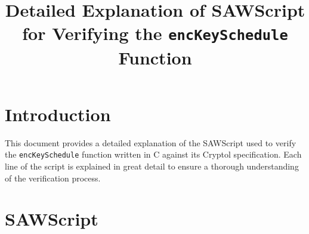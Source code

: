 \documentclass{article}
\title{Detailed Explanation of SAWScript for Verifying the \texttt{encKeySchedule} Function}
\author{}
\date{}
\begin{document}
    \maketitle
    
    \section*{Introduction}
    This document provides a detailed explanation of the SAWScript used to verify the \texttt{encKeySchedule} function written in C against its Cryptol specification. Each line of the script is explained in great detail to ensure a thorough understanding of the verification process.
    
    \section*{SAWScript}
    
    
    
    
    
    
    
    
\end{document}
